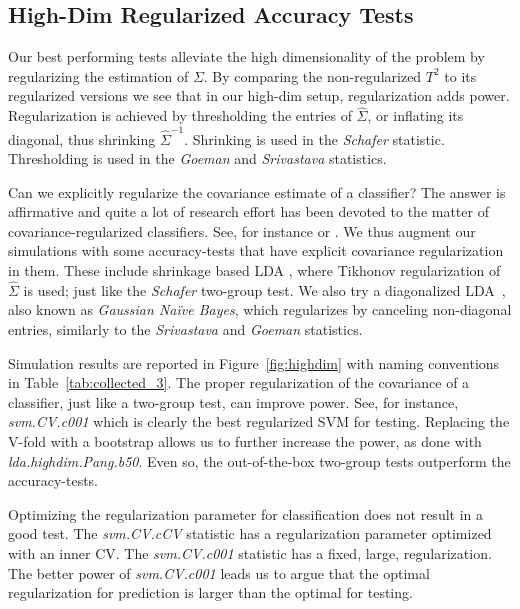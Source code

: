 \documentclass[]{bio}
\begin{document}
\subsection{High-Dim Regularized Accuracy Tests}
\label{sec:highdim}

Our best performing tests alleviate the high dimensionality of the problem by regularizing the estimation of $\Sigma$. 
By comparing the non-regularized $T^2$ to its regularized versions we see that in our high-dim setup, regularization adds power. 
Regularization is achieved by thresholding the entries of $\hat{\Sigma}$, or inflating its diagonal, thus shrinking $\hat \Sigma^{-1}$. 
Shrinking is used in the \emph{Schafer} statistic.
Thresholding is used in the \emph{Goeman} and \emph{Srivastava} statistics.

Can we explicitly regularize the covariance estimate of a classifier?
The answer is affirmative and quite a lot of research effort has been devoted to the matter of covariance-regularized classifiers. 
See, for instance \cite{bickel2004some} or \cite{dobriban2018high}.
We thus augment our simulations with some accuracy-tests that have explicit covariance regularization in them. 
These include shrinkage based LDA \citep{pang_shrinkage-based_2009,ramey_high-dimensional_2016}, where Tikhonov regularization of $\hat \Sigma$ is used; just like the \emph{Schafer} two-group test.
We also try a diagonalized LDA~\citep{dudoit_comparison_2002}, also known as \emph{Gaussian Na\"ive Bayes}, which regularizes by canceling non-diagonal entries, similarly to the \emph{Srivastava} and \emph{Goeman} statistics.

Simulation results are reported in Figure~\ref{fig:highdim} with naming conventions in Table~\ref{tab:collected_3}.
The proper regularization of the covariance of a classifier, just like a two-group test, can improve power. 
See, for instance, \emph{svm.CV.c001} which is clearly the best regularized SVM for testing. 
Replacing the V-fold  with a bootstrap allows us to further increase the power, as done with \emph{lda.highdim.Pang.b50}.
Even so, the out-of-the-box two-group tests outperform the accuracy-tests.

Optimizing the regularization parameter for classification does not result in a good test.
The \emph{svm.CV.cCV} statistic has a regularization parameter optimized with an inner CV. 
The \emph{svm.CV.c001} statistic has a fixed, large, regularization.
The better power of \emph{svm.CV.c001} leads us to argue that the optimal regularization for prediction is larger than the optimal for testing.
\end{document}
